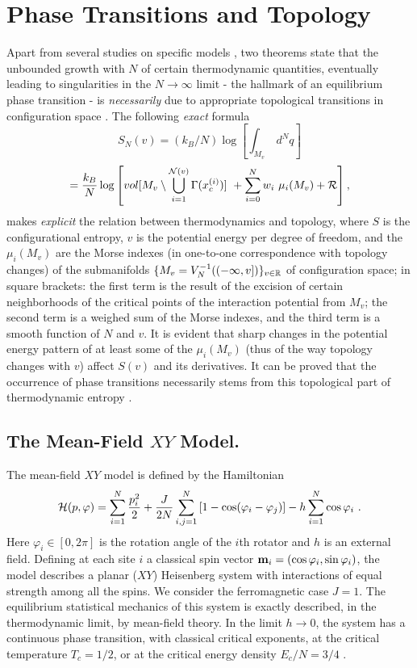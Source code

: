 \documentclass[preprintnumbers,showpacs, showkeys, twocolumn,secnumarabic,amssymb,amsmath,amsfonts,aps, pre]{revtex4-1}
\begin{document}
\section{Phase Transitions and Topology} 
Apart from several studies on specific models \cite{PettiniBook}, 
two theorems state that the unbounded growth with $N$ of certain thermodynamic quantities, eventually leading to singularities in the $N\to\infty$ limit - the hallmark
of an equilibrium phase transition - is {\it necessarily} due to appropriate
topological transitions in configuration space \cite{TH1,TH2}.  The following \textit{exact} formula 
\[
S_N(v) =({k_B}/{N}) \log \left[ \int_{M_v}\ d^Nq\right] 
\]
\[
=\frac{k_B}{N} \log \left[ vol
[{M_v \setminus\bigcup_{i=1}^{{\cal N}(v)} \Gamma(x^{(i)}_c)}]\ +
\sum_{i=0}^N w_i\ \mu_i (M_v)+ {\cal R} \right]  ,\label{exactS}
\]
makes \textit{explicit} the relation between thermodynamics and topology, 
where $S$ is the configurational entropy, $v$ is the potential energy per degree of freedom,  and the
$\mu_i(M_v)$ are the Morse indexes (in one-to-one correspondence
with topology changes) of the submanifolds $\{ M_{v}=V_N^{-1}((-\infty,v])\}_{v \in{\Bbb R}}$ of configuration
space; in square brackets: the first term is the result of the excision of certain neighborhoods of
the critical points of the interaction potential from  $M_{v}$; the second term
is a weighed sum of the Morse indexes, and the third term is a smooth function of $N$ and $v$.
It is evident that sharp changes in the potential energy pattern of at least some of
the $\mu_i(M_v )$ (thus of the way topology changes with $v$) affect $S(v)$ and its
derivatives. It can be proved that the occurrence of phase transitions necessarily
stems from this topological part of thermodynamic entropy \cite{TH1, TH2}.

\subsection{The Mean-Field $XY$ Model.}
\label{sec_MF}
The mean-field $XY$ model is defined by the Hamiltonian
\cite{Antoni:2005,review_longrange}
\begin{equation}
{\cal H}(p,\varphi )= \sum_{i=1}^N \frac{p_i^2}{2} +
 \frac{J}{2N}\sum_{i,j=1}^N
\left[ 1 - \cos(\varphi_i - \varphi_j)\right] -h\sum_{i=1}^N \cos\varphi_i ~.\nonumber
\label{Hmf}
\end{equation}
Here $\varphi_i \in [0,2\pi]$ is the rotation angle of the $i$th rotator
and $h$ is an external field. Defining at each site $i$ a
classical spin vector ${\bf m}_i = (\cos\varphi_i,\sin\varphi_i)$, the model
describes a planar ($XY$) Heisenberg system with interactions of equal strength
among all the spins. We consider the ferromagnetic case $J =1$.
The equilibrium statistical mechanics
of this system is exactly described, in the thermodynamic limit, by mean-field
theory. In the limit $h \to 0$, the system has a continuous
phase transition, with classical critical exponents, at the critical temperature $T_c = 1/2$, or
at the critical energy density $E_c/N = 3/4$ \cite{Antoni:2005}.
\end{document}
